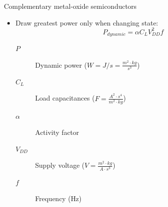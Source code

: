 \documentclass[xcolor={dvipsnames,table}]{beamer}
\begin{document}
\begin{frame}{Complementary metal-oxide semiconductors}
\begin{itemize}
\item Draw greatest power only when changing state:
\begin{equation}
P_{dynamic} = \alpha C_LV_{DD}^{2}f \tag{``dynamic power equation''}
\end{equation}
\begin{description}
\item[$P$] Dynamic power ($W = J/s = \frac{m^{2}\cdot kg}{s^{3}}$)
\item[$C_L$] Load capacitances ($F = \frac{A^{2}\cdot s^{4}}{m^{2}\cdot kg}$)
\item[$\alpha$] Activity factor
\item[$V_{DD}$] Supply voltage ($V = \frac{m^{2}\cdot kg}{A\cdot s^{3}}$)
\item[$f$] Frequency ($\text{Hz}$)
\end{description}
\end{itemize}
\end{frame}
\end{document}
